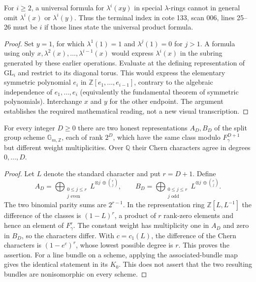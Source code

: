 \begin{proposition}\label{G-02}
For $i\geq2$, a universal formula for $\lambda^i(xy)$ in special $\lambda$-rings cannot in general omit $\lambda^i(x)$ or $\lambda^i(y)$. Thus the terminal index in cote 133, scan 006, lines 25--26 must be $i$ if those lines state the universal product formula.
\end{proposition}
\begin{proof}
Set $y=1$, for which $\lambda^1(1)=1$ and $\lambda^j(1)=0$ for $j>1$. A formula using only $x,\lambda^2(x),\ldots,\lambda^{i-1}(x)$ would express $\lambda^i(x)$ in the subring generated by these earlier operations. Evaluate at the defining representation of $\mathrm{GL}_i$ and restrict to its diagonal torus. This would express the elementary symmetric polynomial $e_i$ in $\mathbb Z[e_1,\ldots,e_{i-1}]$, contrary to the algebraic independence of $e_1,\ldots,e_i$ (equivalently the fundamental theorem of symmetric polynomials). Interchange $x$ and $y$ for the other endpoint. The argument establishes the required mathematical reading, not a new visual transcription.
\end{proof}

\begin{proposition}\label{G-03}
For every integer $D\geq0$ there are two honest representations $A_D,B_D$ of the split group scheme $\mathbb G_{m,\mathbb Z}$, each of rank $2^D$, which have the same class modulo $F^{D+1}_\gamma$ but different weight multiplicities. Over $\mathbb Q$ their Chern characters agree in degrees $0,\ldots,D$.
\end{proposition}
\begin{proof}
Let $L$ denote the standard character and put $r=D+1$. Define
\[
 A_D=\bigoplus_{\substack{0\leq j\leq r\\j\text{ even}}}L^{\otimes j\,\oplus\binom rj},\qquad
 B_D=\bigoplus_{\substack{0\leq j\leq r\\j\text{ odd}}}L^{\otimes j\,\oplus\binom rj}.
\]
The two binomial parity sums are $2^{r-1}$. In the representation ring $\mathbb Z[L,L^{-1}]$ the difference of the classes is $(1-L)^r$, a product of $r$ rank-zero elements and hence an element of $F^r_\gamma$. The constant weight has multiplicity one in $A_D$ and zero in $B_D$, so the characters differ. With $c=c_1(L)$, the difference of the Chern characters is $(1-e^c)^r$, whose lowest possible degree is $r$. This proves the assertion. For a line bundle on a scheme, applying the associated-bundle map gives the identical statement in its $K_0$. This does not assert that the two resulting bundles are nonisomorphic on every scheme.
\end{proof}

